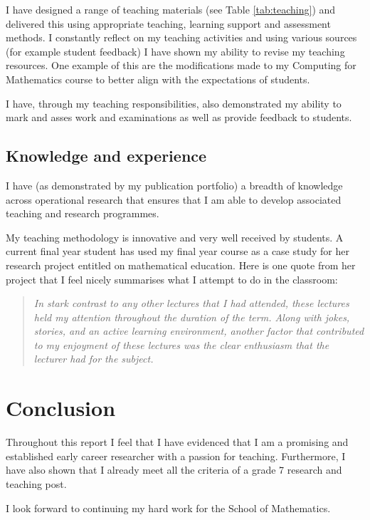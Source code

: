 \documentclass{article}
\begin{document}
I have designed a range of teaching materials (see Table \ref{tab:teaching}) and delivered this using appropriate teaching, learning support and assessment methods.
I constantly reflect on my teaching activities and using various sources (for example student feedback) I have shown my ability to revise my teaching resources.
One example of this are the modifications made to my Computing for Mathematics course to better align with the expectations of students.

I have, through my teaching responsibilities, also demonstrated my ability to mark and asses work and examinations as well as provide feedback to students.

\subsection{Knowledge and experience}

I have (as demonstrated by my publication portfolio) a breadth of knowledge across operational research that ensures that I am able to develop associated teaching and research programmes.

My teaching methodology is innovative and very well received by students.
A current final year student has used my final year course as a case study for her research project entitled on mathematical education.
Here is one quote from her project that I feel nicely summarises what I attempt to do in the classroom:

\begin{quote}
\textit{In stark contrast to any other lectures that I had attended, these lectures held my attention throughout the duration of the term. Along with jokes, stories, and an active learning environment, another factor that contributed to my enjoyment of these lectures was the clear enthusiasm that the lecturer had for the subject.}
\end{quote}

\section{Conclusion}\label{sec:conclusion}

Throughout this report I feel that I have evidenced that I am a promising and established early career researcher with a passion for teaching. Furthermore, I have also shown that I already meet all the criteria of a grade 7 research and teaching post.

I look forward to continuing my hard work for the School of Mathematics.



\end{document}
